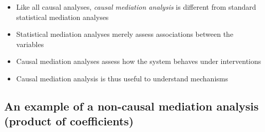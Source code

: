 \documentclass[
  12pt,
]{book}
\providecommand{\tightlist}{%
  \setlength{\itemsep}{0pt}\setlength{\parskip}{0pt}}
\theoremstyle{definition}
\theoremstyle{definition}
\theoremstyle{definition}
\newcommand{\1}{\mathbbm{1}}
\begin{document}
\begin{itemize}
\tightlist
\item
  Like all causal analyses, \emph{causal mediation analysis} is different from
  standard statistical mediation analyses
\item
  Statistical mediation analyses merely assess associations between the variables
\item
  Causal mediation analyses assess how the system behaves under interventions
\item
  Causal mediation analysis is thus useful to understand mechanisms
\end{itemize}

\hypertarget{an-example-of-a-non-causal-mediation-analysis-product-of-coefficients}{%
\subsection{An example of a non-causal mediation analysis (product of coefficients)}\label{an-example-of-a-non-causal-mediation-analysis-product-of-coefficients}}
\end{document}
